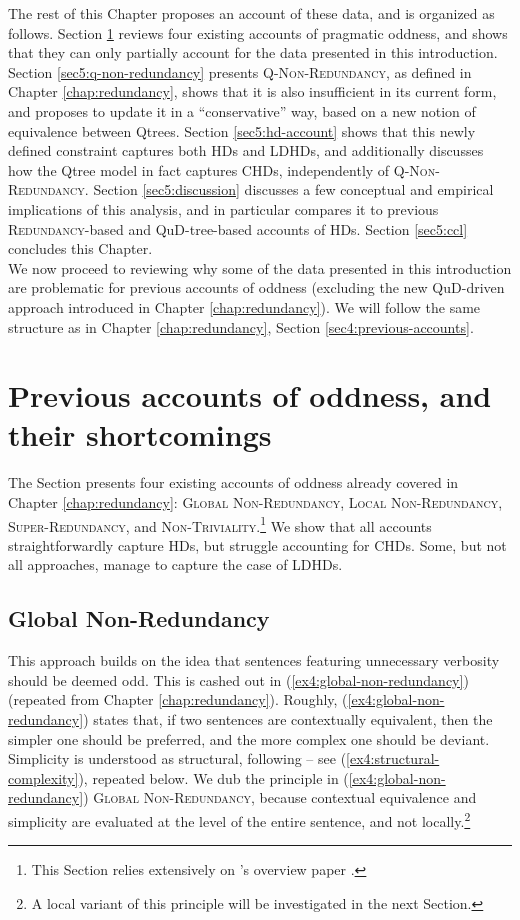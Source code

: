 The rest of this Chapter proposes an account of these data, and is organized as follows. Section \ref{sec5:previous-accounts} reviews four existing accounts of pragmatic oddness, and shows that they can only partially account for the data presented in this introduction. Section \ref{sec5:q-non-redundancy} presents \textsc{Q-Non-Redundancy}, as defined in Chapter \ref{chap:redundancy}, shows that it is also insufficient in its current form, and proposes to update it in a ``conservative'' way, based on a new notion of equivalence between Qtrees. Section \ref{sec5:hd-account} shows that this newly defined constraint captures both HDs and LDHDs, and additionally discusses how the Qtree model in fact captures CHDs, independently of \textsc{Q-Non-Redundancy}. Section \ref{sec5:discussion} discusses a few conceptual and empirical implications of this analysis, and in particular compares it to previous \textsc{Redundancy}-based and QuD-tree-based accounts of HDs. Section \ref{sec5:ccl} concludes this Chapter.\\

We now proceed to reviewing why some of the data presented in this introduction are problematic for previous accounts of oddness (excluding the new QuD-driven approach introduced in Chapter \ref{chap:redundancy}). We will follow the same structure as in Chapter \ref{chap:redundancy}, Section \ref{sec4:previous-accounts}.

\section{Previous accounts of oddness, and their shortcomings}\label{sec5:previous-accounts}

The Section presents four existing accounts of oddness already covered in Chapter \ref{chap:redundancy}: \textsc{Global Non-Redundancy}, \textsc{Local Non-Redundancy}, \textsc{Super-Redundancy}, and \textsc{Non-Triviality}.\footnote{This Section relies extensively on \citeauthor{Marty2022}'s overview paper \parencite{Marty2022}.} We show that all accounts straightforwardly capture HDs, but struggle accounting for CHDs. Some, but not all approaches, manage to capture the case of LDHDs.

\subsection{Global Non-Redundancy}

This approach builds on the idea that sentences featuring unnecessary verbosity should be deemed odd. This is cashed out in (\ref{ex4:global-non-redundancy}) (repeated from Chapter \ref{chap:redundancy}). Roughly, (\ref{ex4:global-non-redundancy}) states that, if two sentences are contextually equivalent, then the simpler one should be preferred, and the more complex one should be deviant. Simplicity is understood as structural, following \textcite{Katzir2007} -- see (\ref{ex4:structural-complexity}), repeated below. We dub the principle in (\ref{ex4:global-non-redundancy}) \textsc{Global Non-Redundancy}, because contextual equivalence and simplicity are evaluated at the level of the entire sentence, and not locally.\footnote{A local variant of this principle will be investigated in the next Section.}

